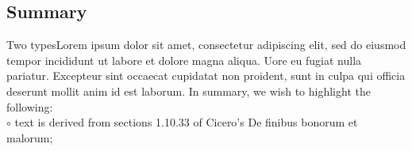 \documentclass[a0,portrait]{a0poster}
\begin{document}
\begin{minipage}[c]{\linewidth}
\begin{framed}
\begin{multicols}{2}
\color{Maroon}
\section*{Summary}
\color{Black}
Two typesLorem ipsum dolor sit amet, consectetur adipiscing elit, sed do eiusmod tempor incididunt ut labore et dolore magna aliqua. Uore eu fugiat nulla pariatur. Excepteur sint occaecat cupidatat non proident, sunt in culpa qui officia deserunt mollit anim id est laborum. In summary, we wish to highlight the following:\\ 
\hspace{0.1cm}$\circ$ text is derived from sections 1.10.33 of Cicero's De finibus bonorum et malorum;\\

\color{Maroon} \\

\color{Black}

\printbibliography

\end{multicols}
\vspace{0.5cm}
\end{framed}
\end{minipage}
\end{document}
